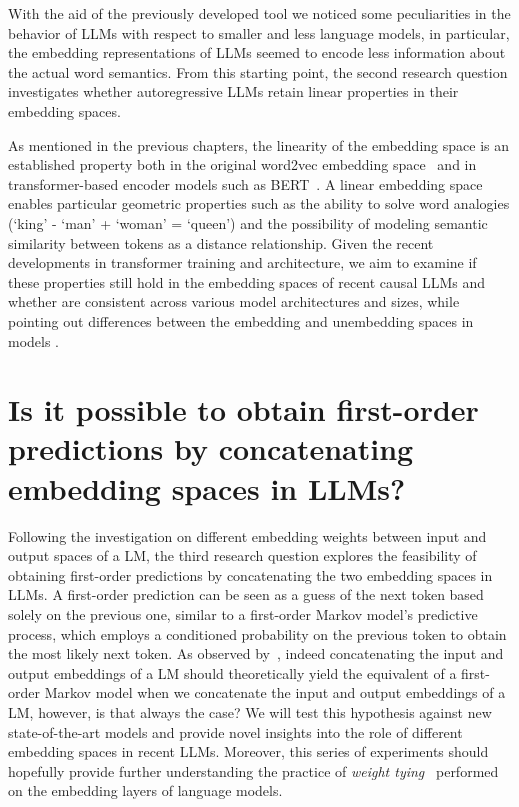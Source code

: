 With the aid of the previously developed tool we noticed some peculiarities in the behavior of LLMs with respect to smaller and less  language models, in particular, the embedding representations of LLMs seemed to encode less information about the actual word semantics.
From this starting point, the second research question investigates whether autoregressive LLMs retain linear properties in their embedding spaces.

As mentioned in the previous chapters, the linearity of the embedding space is an established property both in the original word2vec embedding space~\cite{mikolov2013} and in transformer-based encoder models such as BERT~\cite{devlin2019}.
A linear embedding space enables particular geometric properties such as the ability to solve word analogies (`king' - `man' + `woman' = `queen') and the possibility of modeling semantic similarity between tokens as a distance relationship.
Given the recent developments in transformer training and architecture, we aim to examine if these properties still hold in the embedding spaces of recent causal LLMs and whether  are consistent across various model architectures and sizes, while pointing out differences between the embedding and unembedding spaces in models .

\section{Is it possible to obtain first-order \texorpdfstring{ \\ }{} \mbox{predictions} by \mbox{concatenating} \texorpdfstring{ \\ }{} embedding spaces in LLMs?}\label{sec:rq_fom}

Following the investigation on different embedding weights between input and output spaces of a LM, the third research question explores the feasibility of obtaining first-order predictions by concatenating the two embedding spaces in LLMs.
A first-order prediction can be seen as a guess of the next token based solely on the previous one, similar to a first-order Markov model's predictive process, which employs a conditioned probability on the previous token to obtain the most likely next token.
As observed by~\citet{elhage2021}, indeed concatenating the input and output embeddings of a LM should theoretically yield the equivalent of a first-order Markov model when we concatenate the input and output embeddings of a LM, however, is that always the case?
We will test this hypothesis against new state-of-the-art models and provide novel insights into the role of different embedding spaces in recent LLMs.
Moreover, this series of experiments should hopefully provide further understanding  the practice of \emph{weight tying}~\cite{inan2017,press2017} performed on the embedding layers of language models.
